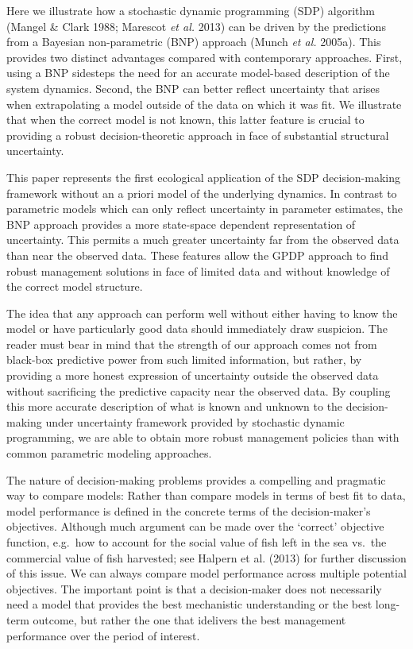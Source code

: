 \documentclass[author-year, 12pt,review]{elsarticle} %
\begin{document}
Here we illustrate how a stochastic dynamic programming (SDP) algorithm
(Mangel \& Clark 1988; Marescot \emph{et al.} 2013) can be driven by the
predictions from a Bayesian non-parametric (BNP) approach (Munch
\emph{et al.} 2005a). This provides two distinct advantages compared
with contemporary approaches. First, using a BNP sidesteps the need for
an accurate model-based description of the system dynamics. Second, the
BNP can better reflect uncertainty that arises when extrapolating a
model outside of the data on which it was fit. We illustrate that when
the correct model is not known, this latter feature is crucial to
providing a robust decision-theoretic approach in face of substantial
structural uncertainty.

This paper represents the first ecological application of the SDP
decision-making framework without an a priori model of the underlying
dynamics. In contrast to parametric models which can only reflect
uncertainty in parameter estimates, the BNP approach provides a more
state-space dependent representation of uncertainty. This permits a much
greater uncertainty far from the observed data than near the observed
data. These features allow the GPDP approach to find robust management
solutions in face of limited data and without knowledge of the correct
model structure.

The idea that any approach can perform well without either having to
know the model or have particularly good data should immediately draw
suspicion. The reader must bear in mind that the strength of our
approach comes not from black-box predictive power from such limited
information, but rather, by providing a more honest expression of
uncertainty outside the observed data without sacrificing the predictive
capacity near the observed data. By coupling this more accurate
description of what is known and unknown to the decision-making under
uncertainty framework provided by stochastic dynamic programming, we are
able to obtain more robust management policies than with common
parametric modeling approaches.

The nature of decision-making problems provides a compelling and
pragmatic way to compare models: Rather than compare models in terms of
best fit to data, model performance is defined in the concrete terms of
the decision-maker's objectives. Although much argument can be made over
the `correct' objective function, e.g.~how to account for the social
value of fish left in the sea vs.~the commercial value of fish
harvested; see Halpern et al. (2013) for further discussion of this
issue. We can always compare model performance across multiple potential
objectives. The important point is that a decision-maker does not
necessarily need a model that provides the best mechanistic
understanding or the best long-term outcome, but rather the one that
idelivers the best management performance over the period of interest.
\end{document}
